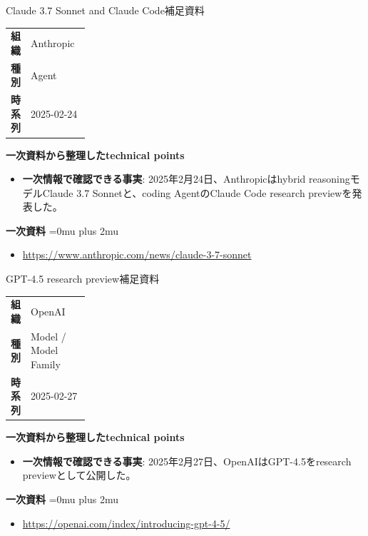 \begin{technicalnote}{Claude 3.7 Sonnet and Claude Code}{補足資料}
\begingroup
\begin{tabularx}{\linewidth}{@{}>{\bfseries}p{0.22\linewidth}X@{}}
組織 & Anthropic \\
種別 & Agent \\
時系列 & 2025-02-24 \\
\end{tabularx}
\smallskip
{\bfseries 一次資料から整理したtechnical points}
\begin{itemize}[leftmargin=1.5em,itemsep=0.35em]
\item \textbf{一次情報で確認できる事実}: 2025年2月24日、Anthropicはhybrid reasoningモデルClaude 3.7 Sonnetと、coding AgentのClaude Code research previewを発表した。
\end{itemize}
\begin{samepage}
{\bfseries 一次資料}
\begingroup\sloppy
\Urlmuskip=0mu plus 2mu\relax
\begin{itemize}[leftmargin=1.5em,itemsep=0.25em]
\item {\scriptsize\url{https://www.anthropic.com/news/claude-3-7-sonnet}}
\end{itemize}
\endgroup
\end{samepage}
\endgroup
\end{technicalnote}
\medskip

\begin{technicalnote}{GPT-4.5 research preview}{補足資料}
\begingroup
\begin{tabularx}{\linewidth}{@{}>{\bfseries}p{0.22\linewidth}X@{}}
組織 & OpenAI \\
種別 & Model / Model Family \\
時系列 & 2025-02-27 \\
\end{tabularx}
\smallskip
{\bfseries 一次資料から整理したtechnical points}
\begin{itemize}[leftmargin=1.5em,itemsep=0.35em]
\item \textbf{一次情報で確認できる事実}: 2025年2月27日、OpenAIはGPT-4.5をresearch previewとして公開した。
\end{itemize}
\begin{samepage}
{\bfseries 一次資料}
\begingroup\sloppy
\Urlmuskip=0mu plus 2mu\relax
\begin{itemize}[leftmargin=1.5em,itemsep=0.25em]
\item {\scriptsize\url{https://openai.com/index/introducing-gpt-4-5/}}
\end{itemize}
\endgroup
\end{samepage}
\endgroup
\end{technicalnote}
\medskip

